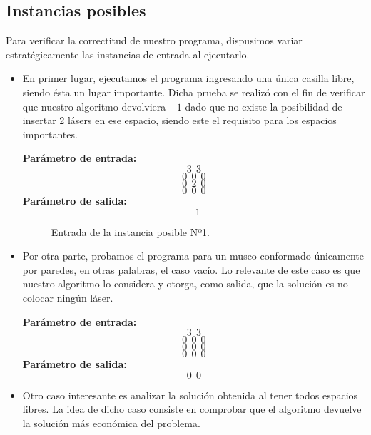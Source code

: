 \subsection{Instancias posibles}
Para verificar la correctitud de nuestro programa, dispusimos variar estratégicamente las instancias de entrada al ejecutarlo.
\begin{itemize}
\item En primer lugar, ejecutamos el programa ingresando una única casilla libre, siendo ésta un lugar importante. Dicha prueba se realizó con el fin de verificar que nuestro algoritmo devolviera $-1$ dado que no existe la posibilidad de insertar 2 lásers en ese espacio, siendo este el requisito para los espacios importantes.\newline

\textbf{Parámetro de entrada:} 
$$3\ \ 3$$
$$0\ \ 0\ \ 0$$
$$0\ \ 2\ \ 0$$
$$0\ \ 0\ \ 0$$
\textbf{Parámetro de salida:} $$-1$$\newline

\begin{center}
\begin{figure}[H] %
\begin{minipage}[t]{.45\textwidth}
\begin{center}
\caption{Entrada de la instancia posible Nº1.}
\end{center}
\label{fig-tc1}
\end{minipage}
\end{figure}
\end{center}

\item Por otra parte, probamos el programa para un museo conformado únicamente por paredes, en otras palabras, el caso vacío. Lo relevante de este caso es que nuestro algoritmo lo considera y otorga, como salida, que la solución es no colocar ningún láser.

\textbf{Parámetro de entrada:} 
$$3\ \ 3$$
$$0\ \ 0\ \ 0$$
$$0\ \ 0\ \ 0$$
$$0\ \ 0\ \ 0$$
\textbf{Parámetro de salida:} $$0\ \ 0$$\newline

\item Otro caso interesante es analizar la solución obtenida al tener todos espacios libres. La idea de dicho caso consiste en comprobar que el algoritmo devuelve la solución más económica del problema.\newline


\end{itemize}
